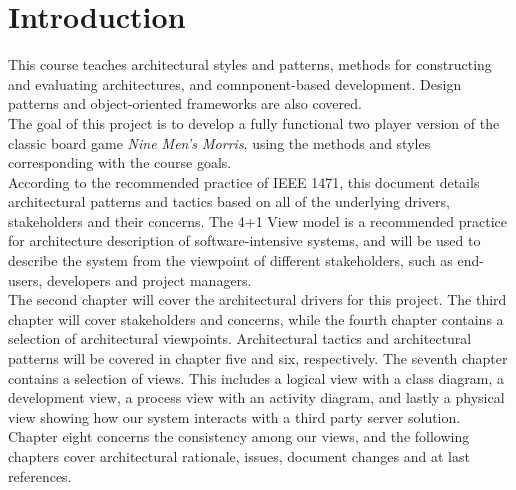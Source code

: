 \section{Introduction}
This course teaches architectural styles and patterns, methods for constructing and evaluating architectures, and comnponent-based development. Design patterns and object-oriented frameworks are also covered. \\

The goal of this project is to develop a fully functional two player version of the classic board game \emph{Nine Men's Morris}, using the methods and styles corresponding with the course goals. \\

According to the recommended practice of IEEE 1471, this document details architectural patterns and tactics based on all of the underlying drivers, stakeholders and their concerns. The 4+1 View model is a recommended practice for architecture description of software-intensive systems, and will be used to describe the system from the viewpoint of different stakeholders, such as end-users, developers and project managers. \\

The second chapter will cover the architectural drivers for this project. The third chapter will cover stakeholders and concerns, while the fourth chapter contains a selection of architectural viewpoints. Architectural tactics and architectural patterns will be covered in chapter five and six, respectively. The seventh chapter contains a selection of views. This includes a logical view with a class diagram, a development view, a process view with an activity diagram, and lastly a physical view showing how our system interacts with a third party server solution. Chapter eight concerns the consistency among our views, and the following chapters cover architectural rationale, issues, document changes and at last references.



